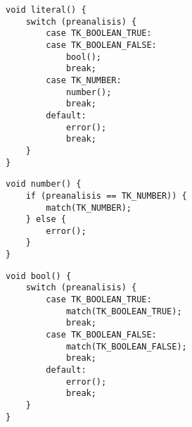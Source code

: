 \begin{multicols}{2}
\begin{verbatim}
void literal() {
	switch (preanalisis) {
		case TK_BOOLEAN_TRUE:
		case TK_BOOLEAN_FALSE:
			bool();
			break;
		case TK_NUMBER:
			number();
			break;
		default:
			error();
			break;
	}
}
\end{verbatim}
\begin{verbatim}
void number() {
	if (preanalisis == TK_NUMBER)) {
		match(TK_NUMBER);
	} else {
		error();
	}
}
\end{verbatim}
\begin{verbatim}
void bool() {
	switch (preanalisis) {
		case TK_BOOLEAN_TRUE:
			match(TK_BOOLEAN_TRUE);
			break;
		case TK_BOOLEAN_FALSE:
			match(TK_BOOLEAN_FALSE);
			break;
		default:
			error();
			break;
	}
}
\end{verbatim}
\end{multicols}